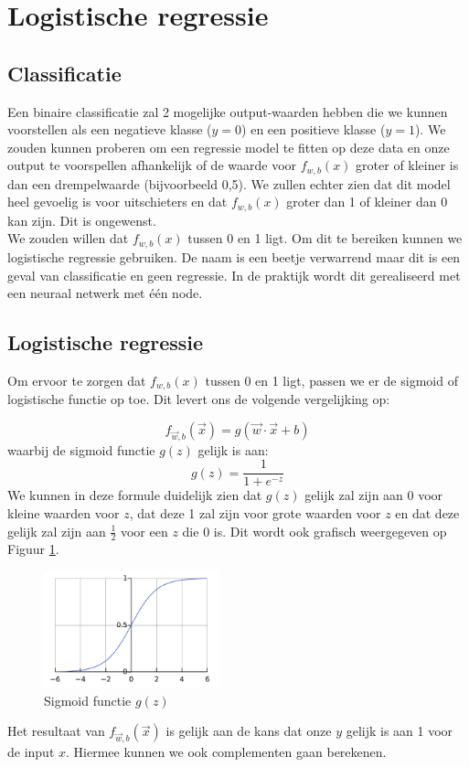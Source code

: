 \section{Logistische regressie }

\subsection{Classificatie}
Een binaire classificatie zal 2 mogelijke output-waarden hebben die we kunnen voorstellen als een negatieve klasse ($y = 0$) en een positieve klasse ($y = 1$).  We zouden kunnen proberen om een regressie model te fitten op deze data en onze output te voorspellen afhankelijk of de waarde voor $f_{w,b}(x)$ groter of kleiner is dan een drempelwaarde (bijvoorbeeld 0,5). We zullen echter zien dat dit model heel gevoelig is voor uitschieters en dat $f_{w,b}(x)$ groter dan 1 of kleiner dan 0 kan zijn. Dit is ongewenst.\\
\newline
We zouden willen dat $f_{w,b}(x)$ tussen 0 en 1 ligt. Om dit te bereiken kunnen we logistische regressie gebruiken. De naam is een beetje verwarrend maar dit is een geval van classificatie en geen regressie. In de praktijk wordt dit gerealiseerd met een neuraal netwerk met één node. 

\subsection{Logistische regressie }

Om ervoor te zorgen dat $f_{w,b}(x)$ tussen 0 en 1 ligt, passen we er de sigmoid of logistische functie op toe. Dit levert ons de volgende vergelijking op: 

\begin{equation}
	f_{\vec{w},b}(\vec{x}) = g(\vec{w} \cdot \vec{x} + b)
	\label{eq:f-wb-log}
\end{equation}
waarbij de sigmoid functie $g(z)$ gelijk is aan:
\begin{equation}
	g(z) = \frac{1}{1 + e^{-z}}
\end{equation}
\noindent
We kunnen in deze formule duidelijk zien dat $g(z)$ gelijk zal zijn aan 0 voor kleine waarden voor $z$, dat deze 1 zal zijn voor grote waarden voor $z$ en dat deze gelijk zal zijn aan $\frac{1}{2}$ voor een $z$ die 0 is. Dit wordt ook grafisch weergegeven op Figuur \ref{fig:sigmoid}.

\begin{figure}[h]
	\centering
	\includegraphics[width=0.45\textwidth]{images/9-sigmoid-function.png}
	\caption{Sigmoid functie $g(z)$}
	\label{fig:sigmoid}
\end{figure}
\noindent
Het resultaat van $f_{\vec{w},b}(\vec{x})$ is gelijk aan de kans dat onze $y$ gelijk is aan 1 voor de input $x$. Hiermee kunnen we ook complementen gaan berekenen. 

